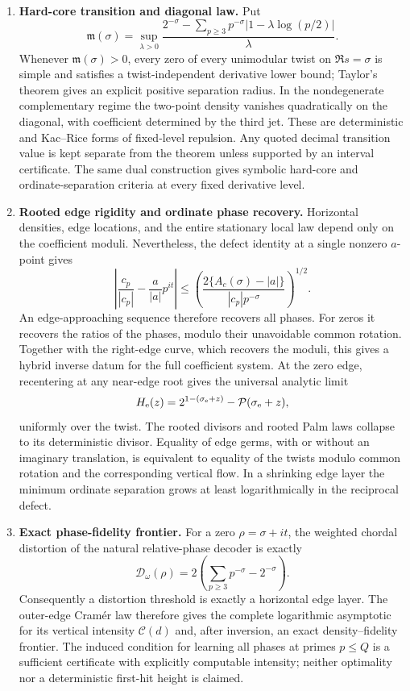 \documentclass[11pt]{article}
\theoremstyle{definition}
\theoremstyle{remark}
\newcommand{\cP}{\mathcal P}
\begin{document}
\begin{enumerate}[label=\textup{(\Roman*)},leftmargin=2.4em]
\item \textbf{Hard-core transition and diagonal law.}
Put
\[
 \mathfrak m(\sigma)=\sup_{\lambda>0}
 \frac{2^{-\sigma}-\sum_{p\geq3}p^{-\sigma}
       |1-\lambda\log(p/2)|}{\lambda}.
\]
Whenever $\mathfrak m(\sigma)>0$, every zero of every unimodular twist on
$\Re s=\sigma$ is simple and satisfies a twist-independent derivative lower
bound; Taylor's theorem gives an explicit positive separation radius.  In the
nondegenerate complementary regime the two-point density vanishes quadratically
on the diagonal, with coefficient determined by the third jet.  These are
deterministic and Kac--Rice forms of fixed-level repulsion.  Any quoted decimal
transition value is kept separate from the theorem unless supported by an
interval certificate.  The same dual construction gives symbolic hard-core
and ordinate-separation criteria at every fixed derivative level.

\item \textbf{Rooted edge rigidity and ordinate phase recovery.}
Horizontal densities, edge locations, and the entire stationary local law
depend only on the coefficient moduli.  Nevertheless, the defect identity at a
single nonzero $a$-point gives
\[
 \left|\frac{c_p}{|c_p|}-\frac{a}{|a|}p^{it}\right|
 \leq
 \left(\frac{2\{A_c(\sigma)-|a|\}}
 {|c_p|p^{-\sigma}}\right)^{1/2}.
\]
An edge-approaching sequence therefore recovers all phases.  For zeros it
recovers the ratios of the phases, modulo their unavoidable common rotation.
Together with the right-edge curve, which recovers the moduli, this gives a
hybrid inverse datum for the full coefficient system.  At the zero
edge, recentering at any near-edge root gives the universal analytic limit
\[
 H_{\rm e}(z)=2^{1-(\sigma_{\rm e}+z)}-\cP(\sigma_{\rm e}+z),
\]
uniformly over the twist.  The rooted divisors and rooted Palm laws collapse to
its deterministic divisor.  Equality of edge germs, with or without an
imaginary translation, is equivalent to equality of the twists modulo common
rotation and the corresponding vertical flow.  In a shrinking edge layer the
minimum ordinate separation grows at least logarithmically in the reciprocal
defect.

\item \textbf{Exact phase-fidelity frontier.}
For a zero $\rho=\sigma+it$, the weighted chordal distortion of the natural
relative-phase decoder is exactly
\[
 \mathcal D_\omega(\rho)
 =2\left(\sum_{p\ge3}p^{-\sigma}-2^{-\sigma}\right).
\]
Consequently a distortion threshold is exactly a horizontal edge layer.  The
outer-edge Cram\'er law therefore gives the complete logarithmic asymptotic for
its vertical intensity $\mathcal C(d)$ and, after inversion, an exact
density--fidelity frontier.  The induced condition for learning all phases at
primes $p\le Q$ is a sufficient certificate with explicitly computable
intensity; neither optimality nor a deterministic first-hit height is claimed.


\end{enumerate}
\end{document}
